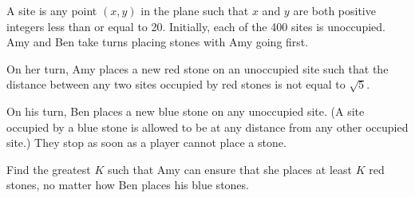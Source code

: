 A site is any point $(x, y)$ in the plane such that $x$ and $y$ are both positive integers less than or equal to 20.
Initially, each of the 400 sites is unoccupied. Amy and Ben take turns 
placing stones with Amy going first.

On her turn, Amy places a new red 
stone on an unoccupied site such that the distance between any two sites
 occupied by red stones is not equal to $\sqrt{5}$.

 On his turn, Ben places a new blue stone on any unoccupied site. (A 
site occupied by a blue stone is allowed to be at any distance from any 
other occupied site.) They stop as soon as a player cannot place a 
stone.

Find the greatest $K$ such that Amy can ensure that she places at least $K$ red stones, no matter how Ben places his blue stones.
